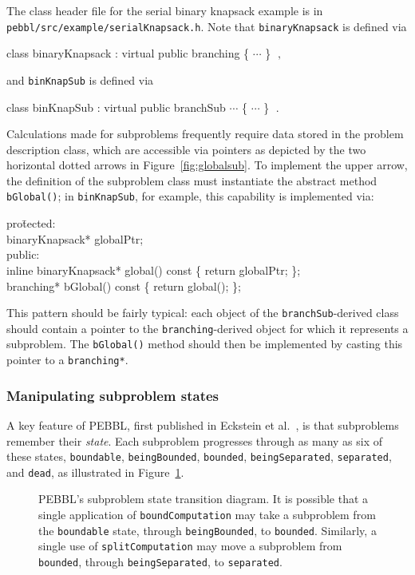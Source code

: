 The class header file for the serial binary knapsack example is in
\texttt{pebbl/src/\linebreak[0]example/serialKnapsack.h}.  Note that
\texttt{binaryKnapsack} is defined via
\begin{codeblock}
class binaryKnapsack : virtual public branching \{ $\cdots$ \}
$\;,$
\end{codeblock}
and \texttt{binKnapSub} is defined via
\begin{codeblock}
class binKnapSub : virtual public branchSub $\cdots$ \{ $\cdots$ \}
$\;.$
\end{codeblock}
Calculations made for subproblems frequently require data
stored in the problem description class, which are accessible via
pointers as depicted by the two horizontal dotted arrows in
Figure~\ref{fig:globalsub}.  To implement the upper arrow, the
definition of the subproblem class must instantiate the abstract
method \texttt{bGlobal()}; in \texttt{binKnapSub}, for example, this
capability is implemented via:
\begin{codeblock}
pro\=tected: \\
\>  binaryKnapsack* globalPtr;\\
public:\\
\>  inline binaryKnapsack* global() const \{ return globalPtr; \};\\
\>  branching* bGlobal() const \{ return global(); \};\\
\end{codeblock}
This pattern should be fairly typical: each object of the
\texttt{branchSub}-derived class should contain a pointer to the
\texttt{branching}-derived object for which it represents a
subproblem.  The \texttt{bGlobal()} method should then be implemented
by casting this pointer to a \texttt{branching*}.


\subsubsection{Manipulating subproblem states}
A key feature of PEBBL, first published in Eckstein et al.~\cite{EPH00}, is that
subproblems remember their \emph{state}.  Each subproblem progresses
through as many as six of these states, \texttt{boundable},
\texttt{beingBounded}, \texttt{bounded}, \texttt{beingSeparated}, 
\texttt{separated}, and \texttt{dead}, as illustrated in
Figure~\ref{fig:states}.

\begin{figure}[tbp]
\begin{center}
\vspace{-0.2in}
\end{center}
\caption{PEBBL's subproblem state transition diagram.  It is possible
that a single application of \texttt{boundComputation} may take a
subproblem from the \texttt{boundable} state, through
\texttt{beingBounded}, to \texttt{bounded}.  Similarly, a single use
of \texttt{splitComputation} may move a subproblem from
\texttt{bounded}, through \texttt{beingSeparated}, to
\texttt{separated}.}
\label{fig:states}
\end{figure}

